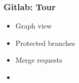 \begin{frame}

\frametitle{Gitlab: Tour}

\begin{itemize}
\item Graph view
\item Protected branches
\item Merge requests
\item 
\end{itemize}

\end{frame}
